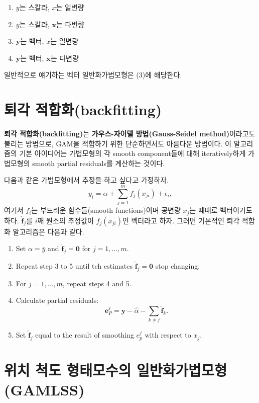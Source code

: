 \documentclass[b5paper,]{scrbook}
\theoremstyle{plain}
\theoremstyle{definition}
\numberwithin{equation}{section}
\begin{document}
\begin{enumerate}
\def\labelenumi{\arabic{enumi}.}
\item
  \(y\)는 스칼라, \(x\)는 일변량
\item
  \(y\)는 스칼라, \(\mathbf{x}\)는 다변량
\item
  \(\mathbf{y}\)는 벡터, \(x\)는 일변량
\item
  \(\mathbf{y}\)는 벡터, \(\mathbf{x}\)는 다변량
\end{enumerate}

일반적으로 얘기하는 벡터 일반화가법모형은 (3)에 해당한다.

\hypertarget{-backfitting}{%
\section{퇴각 적합화(backfitting)}\label{-backfitting}}

\textbf{퇴각 적합화(backfitting)}는 \textbf{가우스-자이델 방법(Gauss-Seidel method)}이라고도 불리는 방법으로, GAM을 적합하기 위한 단순하면서도 아름다운 방법이다. 이 알고리즘의 기본 아이디어는 가법모형의 각 smooth component들에 대해 iteratively하게 가법모형의 smooth partial residuals를 계산하는 것이다.

다음과 같은 가법모형에서 추정을 하고 싶다고 가정하자.
\[y_{i}=\alpha + \sum_{j=1}^{m}f_{j}(x_{ji})+\epsilon_{i},\]
여기서 \(f_{i}\)는 부드러운 함수들(smooth functions)이며 공변량 \(x_{j}\)는 때때로 벡터이기도 하다. \(\hat{\mathbf{f}}_{j}\)를 \(i\)째 원소의 추정값이 \(f_{j}(x_{ji})\)인 벡터라고 하자. 그러면 기본적인 퇴각 적합화 알고리즘은 다음과 같다.

\begin{enumerate}
\def\labelenumi{\arabic{enumi}.}
\item
  Set \(\alpha=\bar{y}\) and \(\hat{\mathbf{f}}_{j}=\mathbf{0}\) for \(j=1,\ldots , m\).
\item
  Repeat step 3 to 5 until teh estimates \(\hat{\mathbf{f}}_{j}=\mathbf{0}\) stop changing.
\item
  For \(j=1,\ldots ,m\), repeat steps 4 and 5.
\item
  Calculate partial residuals:
  \[\mathbf{e}_{P}^{j}=\mathbf{y}-\hat{\alpha}-\sum_{k\neq j}\hat{\mathbf{f}}_{k}.\]
\item
  Set \(\hat{\mathbf{f}}_{j}\) equal to the result of smoothing \(e_{p}^{j}\) with respect to \(x_{j}\).
\end{enumerate}

\hypertarget{---gamlss}{%
\section{위치 척도 형태모수의 일반화가법모형(GAMLSS)}\label{---gamlss}}
\end{document}
